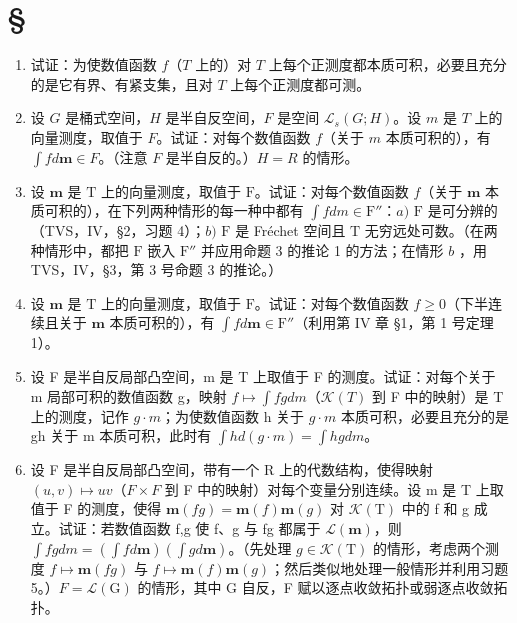 \section*{\texorpdfstring{\S\CurrentExerciseGroup}{第{\CurrentExerciseGroup}节}}
{}

\begin{enumerate}
\def\labelenumi{\arabic{enumi})}
\item
  试证：为使数值函数 \(f\)（\(T\) 上的）对 \(T\) 上每个正测度都本质可积，必要且充分的是它有界、有紧支集，且对 \(T\) 上每个正测度都可测。
\item
  设 \(G\) 是桶式空间，\(H\) 是半自反空间，\(F\) 是空间 \(\mathcal{L}_s(G;H)\)。设 \(m\) 是 \(T\) 上的向量测度，取值于 \(F\)。试证：对每个数值函数 \(f\)（关于 \(m\) 本质可积的），有 \(\int fd\mathbf{m} \in F\)。（注意 \(F\) 是半自反的。）\(H = R\) 的情形。
\item
  设 \(\mathbf{m}\) 是 \(\mathrm{T}\) 上的向量测度，取值于 \(\mathrm{F}\)。试证：对每个数值函数 \(f\)（关于 \(\mathbf{m}\) 本质可积的），在下列两种情形的每一种中都有 \(\int f dm \in \mathrm{F}''\)：\(a)\) \(\mathrm{F}\) 是可分辨的（TVS，IV，§2，习题 4）；\(b)\) \(\mathrm{F}\) 是 Fréchet 空间且 \(\mathrm{T}\) 无穷远处可数。（在两种情形中，都把 \(\mathrm{F}\) 嵌入 \(\mathrm{F}''\) 并应用命题 3 的推论 1 的方法；在情形 \(b\) ，用 TVS，IV，§3，第 3 号命题 3 的推论。）
\item
  设 \(\mathbf{m}\) 是 \(\mathrm{T}\) 上的向量测度，取值于 \(\mathrm{F}\)。试证：对每个数值函数 \(f \geqslant 0\)（下半连续且关于 \(\mathbf{m}\) 本质可积的），有 \(\int f d\mathbf{m} \in \mathrm{F}''\)（利用第 IV 章 §1，第 1 号定理 1）。
\item
  设 F 是半自反局部凸空间，m 是 T 上取值于 F 的测度。试证：对每个关于 m 局部可积的数值函数 g，映射 \(f \mapsto \int fg dm\)（\(\mathcal{K}(T)\) 到 F 中的映射）是 T 上的测度，记作 \(g \cdot m\)；为使数值函数 h 关于 \(g \cdot m\) 本质可积，必要且充分的是 gh 关于 m 本质可积，此时有 \(\int h d(g \cdot m) = \int hg dm\)。
\item
  设 F 是半自反局部凸空间，带有一个 R 上的代数结构，使得映射 \((u,v)\mapsto uv\)（\(F\times F\) 到 F 中的映射）对每个变量分别连续。设 m 是 T 上取值于 F 的测度，使得 \(\mathbf{m}(fg)=\mathbf{m}(f)\mathbf{m}(g)\) 对 \(\mathcal{K}(\mathrm{T})\) 中的 f 和 g 成立。试证：若数值函数 f,g 使 f、g 与 fg 都属于 \(\mathcal{L}(\mathbf{m})\)，则 \(\int fg dm=(\int fd\mathbf{m})(\int gd\mathbf{m})\)。（先处理 \(g\in\mathcal{K}(\mathrm{T})\) 的情形，考虑两个测度 \(f\mapsto\mathbf{m}(fg)\) 与 \(f\mapsto\mathbf{m}(f)\mathbf{m}(g)\)；然后类似地处理一般情形并利用习题 5。）\(F=\mathcal{L}(\mathrm{G})\) 的情形，其中 G 自反，F 赋以逐点收敛拓扑或弱逐点收敛拓扑。

\end{enumerate}
